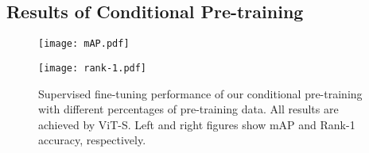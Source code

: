 \documentclass[10pt,twocolumn,letterpaper]{article}
\begin{document}
\subsection{Results of Conditional Pre-training}

\vspace{-1em}
\begin{figure}[htb]
    \begin{minipage}[t]{0.48\linewidth}
    \centering
    \texttt{[image: mAP.pdf]}
    \end{minipage}
    \begin{minipage}[t]{0.49\linewidth}
    \centering
    \texttt{[image: rank-1.pdf]}
    \end{minipage}
	\caption{Supervised fine-tuning performance of our conditional pre-training with different percentages of pre-training data. All results are achieved by ViT-S. Left and right figures show mAP and Rank-1 accuracy, respectively.} 
	\label{fig:cfs}
\end{figure}
\end{document}
